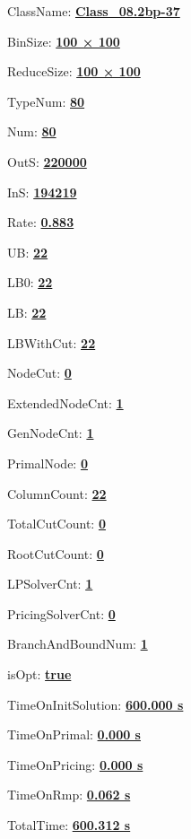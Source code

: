 \documentclass[11pt]{article}
\begin{document}
\pagestyle{empty}


ClassName: \underline{\textbf{Class_08.2bp-37}}
\par
BinSize: \underline{\textbf{100 × 100}}
\par
ReduceSize: \underline{\textbf{100 × 100}}
\par
TypeNum: \underline{\textbf{80}}
\par
Num: \underline{\textbf{80}}
\par
OutS: \underline{\textbf{220000}}
\par
InS: \underline{\textbf{194219}}
\par
Rate: \underline{\textbf{0.883}}
\par
UB: \underline{\textbf{22}}
\par
LB0: \underline{\textbf{22}}
\par
LB: \underline{\textbf{22}}
\par
LBWithCut: \underline{\textbf{22}}
\par
NodeCut: \underline{\textbf{0}}
\par
ExtendedNodeCnt: \underline{\textbf{1}}
\par
GenNodeCnt: \underline{\textbf{1}}
\par
PrimalNode: \underline{\textbf{0}}
\par
ColumnCount: \underline{\textbf{22}}
\par
TotalCutCount: \underline{\textbf{0}}
\par
RootCutCount: \underline{\textbf{0}}
\par
LPSolverCnt: \underline{\textbf{1}}
\par
PricingSolverCnt: \underline{\textbf{0}}
\par
BranchAndBoundNum: \underline{\textbf{1}}
\par
isOpt: \underline{\textbf{true}}
\par
TimeOnInitSolution: \underline{\textbf{600.000 s}}
\par
TimeOnPrimal: \underline{\textbf{0.000 s}}
\par
TimeOnPricing: \underline{\textbf{0.000 s}}
\par
TimeOnRmp: \underline{\textbf{0.062 s}}
\par
TotalTime: \underline{\textbf{600.312 s}}
\par
\newpage


\end{document}
